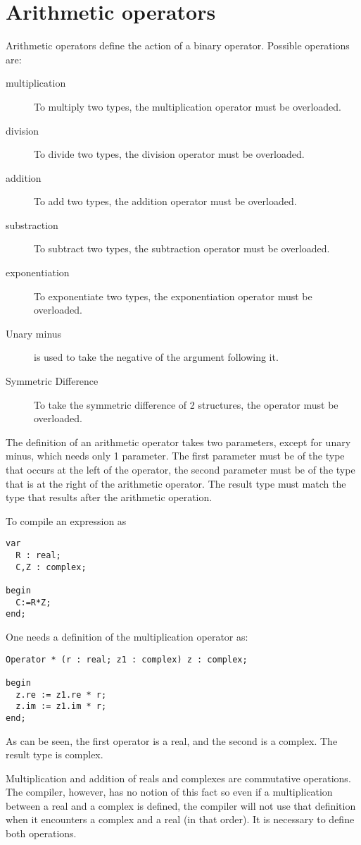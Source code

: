 \section{Arithmetic operators}
Arithmetic operators define the action of a binary operator. Possible
operations are:
\begin{description}
\item[multiplication] To multiply two types, the \var{*} multiplication
operator must be overloaded.
\item[division] To divide two types, the \var{/} division
operator must be overloaded.
\item[addition] To add two types, the \var{+} addition
operator must be overloaded.
\item[substraction] To subtract two types, the \var{-} subtraction
operator must be overloaded.
\item[exponentiation] To exponentiate two types, the \var{**} exponentiation
operator must be overloaded.
\item[Unary minus] is used to take the negative of the argument following
it.
\item[Symmetric Difference] To take the symmetric difference of 2
structures, the \var{><} operator must be overloaded.
\end{description}

The definition of an arithmetic operator takes two parameters, except for
unary minus, which needs only 1 parameter. The first parameter must be of 
the type that occurs at the left of the operator, the second parameter must 
be of the type that is at the right of the arithmetic operator. The result 
type must match the type that results after the arithmetic operation.

To compile an expression as
\begin{verbatim}
var
  R : real;
  C,Z : complex;

begin
  C:=R*Z;
end;
\end{verbatim}
One needs a definition of the multiplication operator as:
\begin{verbatim}
Operator * (r : real; z1 : complex) z : complex;

begin
  z.re := z1.re * r;
  z.im := z1.im * r;
end;
\end{verbatim}
As can be seen, the first operator is a real, and the second is
a complex. The result type is complex.

Multiplication and addition of reals and complexes are commutative
operations. The compiler, however, has no notion of this fact so even
if a multiplication between a real and a complex is defined, the
compiler will not use that definition when it encounters a complex
and a real (in that order). It is necessary to define both operations.

